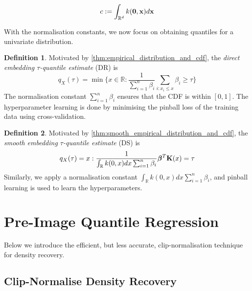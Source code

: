 \documentclass[twoside]{article} \usepackage{aistats2017}
\theoremstyle{definition}
\newtheorem{definition}{Definition}[section]
\theoremstyle{theorem}
\newcommand{\rv}[1]{{#1}}
\begin{document}
		\begin{equation}
			c := \int_{\mathbb{R}^{d}} k(\mathbf{0}, \mathbf{x}) d\mathbf{x}
		\label{eq:constant_definition}
		\end{equation}
		
		With the normalisation constants, we now focus on obtaining quantiles for a univariate distribution.

		\theoremstyle{definition}
		\begin{definition}
			Motivated by \cref{thm:empirical_distribution_and_cdf}, the \textit{direct embedding $\tau$-quantile estimate} (DR) is
			\begin{equation}
			q_{\rv{X}}(\tau) = \min\{x \in \mathbb{R} : \frac{1}{\sum_{i = 1}^{n} \beta_{i}} \sum_{i : x_{i} \leq x} \beta_{i} \geq \tau\}
			\end{equation}	
			The normalisation constant $\sum_{i = 1}^{n} \beta_{i}$ ensures that the CDF is within $[0, 1]$. The hyperparameter learning is done by minimising the pinball loss of the training data using cross-validation.
		\end{definition}
		
		\theoremstyle{definition}
		\begin{definition}
			Motivated by \cref{thm:smooth_empirical_distribution_and_cdf}, the \textit{smooth embedding $\tau$-quantile estimate} (DS) is
			\begin{equation}
			q_{\rv{X}}(\tau) = x : \frac{1}{\int_{\mathbb{R}} k(0, x) dx \sum_{i = 1}^{n} \beta_{i}} \bm{\beta}^{T} \bvec{K}(x) = \tau
			\end{equation}	
			Similarly, we apply a normalisation constant $\int_{\mathbb{R}} k(0, x) dx \sum_{i = 1}^{n} \beta_{i}$, and pinball learning is used to learn the hyperparameters.
		\end{definition}
	
\section{Pre-Image Quantile Regression}
	\label{sec:pre_image_quantile_regression}

	Below we introduce the efficient, but less accurate, clip-normalisation technique for density recovery.
	
	\subsection{Clip-Normalise Density Recovery}
	\label{sec:pre_image_quantile_regression:density_recovery}
	
\end{document}
